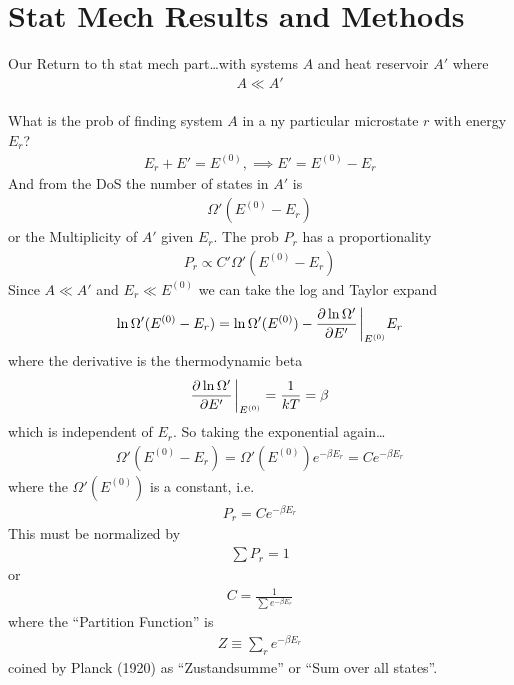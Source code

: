 \documentclass[../main.tex]{subfiles}
\begin{document}
\pagestyle{fancy}

\section{Stat Mech Results and Methods}

Our Return to th stat mech part\dots with systems $A$ and heat reservoir $A'$ where
\begin{align*}
    A \ll A'
\end{align*}

\paragraph{} What is the prob of finding system $A$ in a ny particular microstate $r$ with energy $E_r$?
\begin{align*}
    E_r + E' = E^{(0)}, \implies E' = E^{(0)} - E_r
\end{align*}
And from the DoS the number of states in $A'$ is
\begin{align*}
    \Omega'(E^{(0)} - E_r) 
\end{align*}
or the Multiplicity of $A'$ given $E_r$. The prob $P_r$ has a proportionality
\begin{align*}
    P_r \propto C' \Omega'(E^{(0)} - E_r)
\end{align*}
Since $A \ll A'$ and $E_r \ll E^{(0)}$ we can take the log and Taylor expand
\begin{align*}
    \ln\Omega'(E^{(0)} - E_r) = \ln\Omega'(E^{(0)}) - \pdv{\ln\Omega'}{E'}\eval_{E^{(0)}} E_r
\end{align*}
where the derivative is the thermodynamic beta
\begin{align*}
    \pdv{\ln\Omega'}{E'}\eval_{E^{(0)}} = \frac{1}{kT} = \beta
\end{align*}
which is independent of $E_r$. So taking the exponential again\dots
\begin{align*}
    \Omega'(E^{(0)} - E_r) = \Omega'(E^{(0)})e^{-\beta E_r} = C e^{-\beta E_r}
\end{align*}
where the $\Omega'(E^{(0)})$ is a constant, i.e.
\begin{align*}
    P_r = C e^{-\beta E_r}
\end{align*}
This must be normalized by
\begin{align*}
    \sum P_r = 1
\end{align*}
or
\begin{align*}
    C = \frac{1}{\sum e^{-\beta E_r}}
\end{align*}
where the ``Partition Function'' is
\begin{align*}
    Z \equiv \sum_r e^{-\beta E_r}
\end{align*}
coined by Planck (1920) as ``Zustandsumme'' or ``Sum over all states''.
\end{document}
